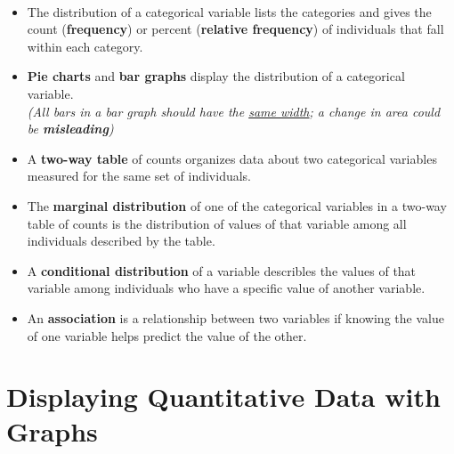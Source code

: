 \documentclass[Main.tex]{subfiles}
\begin{document}
	\begin{exercise} \hfill \\
		\begin{itemize}		
		\item The distribution of a categorical variable lists the categories and gives the count (\textbf{frequency}) or percent (\textbf{relative frequency}) of individuals that fall within each category.\\
		\item \textbf{Pie charts} and \textbf{bar graphs} display the distribution of a categorical variable.\\ \emph{(All bars in a bar graph should have the \underline{same width}; a change in area could be \textbf{misleading})}\\
		\item A \textbf{two-way table} of counts organizes data about two categorical variables measured for the same set of individuals.\\
		\item The \textbf{marginal distribution} of one of the categorical variables in a two-way table of counts is the distribution of values of that variable among all individuals described by the table.\\
		\item A \textbf{conditional distribution} of a variable describles the values of that variable among individuals who have a specific value of another variable.\\
		\item An \textbf{association} is a relationship between two variables if knowing the value of one variable helps predict the value of the other.
		\end{itemize}
	\end{exercise}
	\newpage
	
	\section{Displaying Quantitative Data with Graphs}
	
\end{document}
